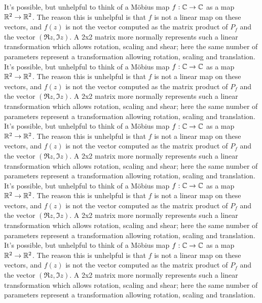 It's possible, but unhelpful to think of a M\"obius map $f:\mathbb{C}\rightarrow\mathbb{C}$ as a  map $\mathbb{R}^2\rightarrow\mathbb{R}^2$.  The reason this is unhelpful is that $f$ is not a linear map on these vectors, and $f(z)$ is not the vector computed as the matrix product of $P_f$ and the vector $(\Re{z},\Im{z})$. A 2x2 matrix more normally represents such a linear transformation which allows rotation, scaling and shear; here the same number of parameters represent a transformation allowing rotation, scaling and translation. 
It's possible, but unhelpful to think of a M\"obius map $f:\mathbb{C}\rightarrow\mathbb{C}$ as a  map $\mathbb{R}^2\rightarrow\mathbb{R}^2$.  The reason this is unhelpful is that $f$ is not a linear map on these vectors, and $f(z)$ is not the vector computed as the matrix product of $P_f$ and the vector $(\Re{z},\Im{z})$. A 2x2 matrix more normally represents such a linear transformation which allows rotation, scaling and shear; here the same number of parameters represent a transformation allowing rotation, scaling and translation. 
It's possible, but unhelpful to think of a M\"obius map $f:\mathbb{C}\rightarrow\mathbb{C}$ as a  map $\mathbb{R}^2\rightarrow\mathbb{R}^2$.  The reason this is unhelpful is that $f$ is not a linear map on these vectors, and $f(z)$ is not the vector computed as the matrix product of $P_f$ and the vector $(\Re{z},\Im{z})$. A 2x2 matrix more normally represents such a linear transformation which allows rotation, scaling and shear; here the same number of parameters represent a transformation allowing rotation, scaling and translation. 
It's possible, but unhelpful to think of a M\"obius map $f:\mathbb{C}\rightarrow\mathbb{C}$ as a  map $\mathbb{R}^2\rightarrow\mathbb{R}^2$.  The reason this is unhelpful is that $f$ is not a linear map on these vectors, and $f(z)$ is not the vector computed as the matrix product of $P_f$ and the vector $(\Re{z},\Im{z})$. A 2x2 matrix more normally represents such a linear transformation which allows rotation, scaling and shear; here the same number of parameters represent a transformation allowing rotation, scaling and translation. 
It's possible, but unhelpful to think of a M\"obius map $f:\mathbb{C}\rightarrow\mathbb{C}$ as a  map $\mathbb{R}^2\rightarrow\mathbb{R}^2$.  The reason this is unhelpful is that $f$ is not a linear map on these vectors, and $f(z)$ is not the vector computed as the matrix product of $P_f$ and the vector $(\Re{z},\Im{z})$. A 2x2 matrix more normally represents such a linear transformation which allows rotation, scaling and shear; here the same number of parameters represent a transformation allowing rotation, scaling and translation. 

